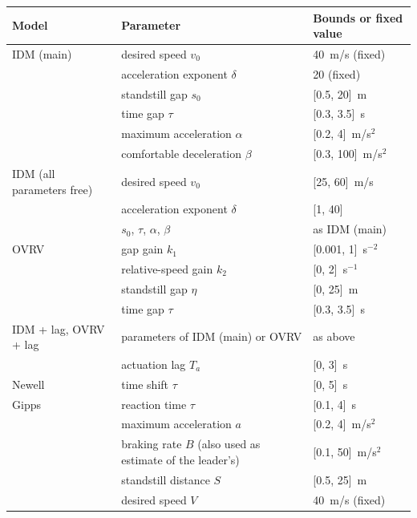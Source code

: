 \begin{tabular}{lll}
\toprule
Model & Parameter & Bounds or fixed value \\
\midrule
IDM (main) & desired speed $v_0$ & 40~m/s (fixed) \\
 & acceleration exponent $\delta$ & 20 (fixed) \\
 & standstill gap $s_0$ & [0.5, 20]~m \\
 & time gap $\tau$ & [0.3, 3.5]~s \\
 & maximum acceleration $\alpha$ & [0.2, 4]~m/s$^2$ \\
 & comfortable deceleration $\beta$ & [0.3, 100]~m/s$^2$ \\
\midrule
IDM (all parameters free) & desired speed $v_0$ & [25, 60]~m/s \\
 & acceleration exponent $\delta$ & [1, 40] \\
 & $s_0$, $\tau$, $\alpha$, $\beta$ & as IDM (main) \\
\midrule
OVRV & gap gain $k_1$ & [0.001, 1]~s$^{-2}$ \\
 & relative-speed gain $k_2$ & [0, 2]~s$^{-1}$ \\
 & standstill gap $\eta$ & [0, 25]~m \\
 & time gap $\tau$ & [0.3, 3.5]~s \\
\midrule
IDM + lag, OVRV + lag & parameters of IDM (main) or OVRV & as above \\
 & actuation lag $T_a$ & [0, 3]~s \\
\midrule
Newell & time shift $\tau$ & [0, 5]~s \\
\midrule
Gipps & reaction time $\tau$ & [0.1, 4]~s \\
 & maximum acceleration $a$ & [0.2, 4]~m/s$^2$ \\
 & braking rate $B$ (also used as estimate of the leader's) & [0.1, 50]~m/s$^2$ \\
 & standstill distance $S$ & [0.5, 25]~m \\
 & desired speed $V$ & 40~m/s (fixed) \\
\bottomrule
\end{tabular}

